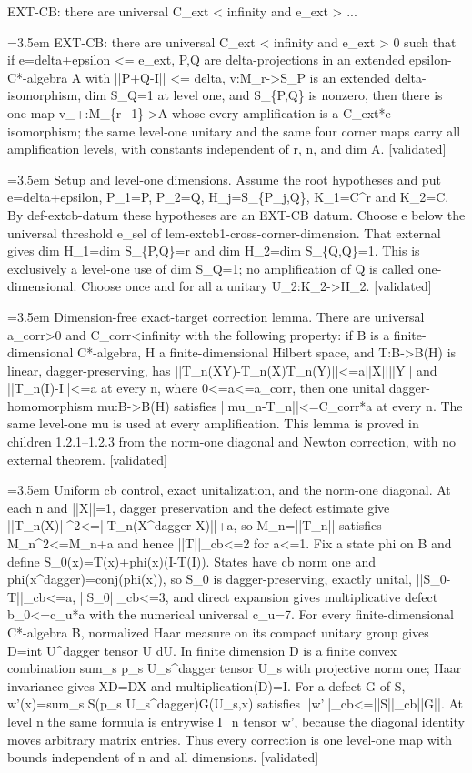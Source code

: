 \documentclass{article}
\newcommand{\step}[1]{\par\noindent\hangindent=3.5em\hangafter=1%
  \makebox[3.5em][l]{\textbf{#1.}}}
\newcommand{\steptag}[1]{\hfill{\small\textsf{[#1]}}}
\begin{document}
\begin{proofbox}{EXT-CB: there are universal C\_ext < infinity and e\_ext > ...}
\step{1} EXT-CB: there are universal C\_ext < infinity and e\_ext > 0 such that if e=delta+epsilon <= e\_ext, P,Q are delta-projections in an extended epsilon-C*-algebra A with ||P+Q-I|| <= delta, v:M\_r->S\_P is an extended delta-isomorphism, dim S\_Q=1 at level one, and S\_\{P,Q\} is nonzero, then there is one map v\_+:M\_\{r+1\}->A whose every amplification is a C\_ext*e-isomorphism; the same level-one unitary and the same four corner maps carry all amplification levels, with constants independent of r, n, and dim A. \steptag{validated} \\[6pt]
\step{1.1} Setup and level-one dimensions. Assume the root hypotheses and put e=delta+epsilon, P\_1=P, P\_2=Q, H\_j=S\_\{P\_j,Q\}, K\_1=C\textasciicircum{}r and K\_2=C. By def-extcb-datum these hypotheses are an EXT-CB datum. Choose e below the universal threshold e\_sel of lem-extcb1-cross-corner-dimension. That external gives dim H\_1=dim S\_\{P,Q\}=r and dim H\_2=dim S\_\{Q,Q\}=1. This is exclusively a level-one use of dim S\_Q=1; no amplification of Q is called one-dimensional. Choose once and for all a unitary U\_2:K\_2->H\_2. \steptag{validated} \\[4pt]
\step{1.2} Dimension-free exact-target correction lemma. There are universal a\_corr>0 and C\_corr<infinity with the following property: if B is a finite-dimensional C*-algebra, H a finite-dimensional Hilbert space, and T:B->B(H) is linear, dagger-preserving, has ||T\_n(XY)-T\_n(X)T\_n(Y)||<=a||X||||Y|| and ||T\_n(I)-I||<=a at every n, where 0<=a<=a\_corr, then one unital dagger-homomorphism mu:B->B(H) satisfies ||mu\_n-T\_n||<=C\_corr*a at every n. The same level-one mu is used at every amplification. This lemma is proved in children 1.2.1--1.2.3 from the norm-one diagonal and Newton correction, with no external theorem. \steptag{validated} \\[6pt]
\step{1.2.1} Uniform cb control, exact unitalization, and the norm-one diagonal. At each n and ||X||=1, dagger preservation and the defect estimate give ||T\_n(X)||\textasciicircum{}2<=||T\_n(X\textasciicircum{}dagger X)||+a, so M\_n=||T\_n|| satisfies M\_n\textasciicircum{}2<=M\_n+a and hence ||T||\_cb<=2 for a<=1. Fix a state phi on B and define S\_0(x)=T(x)+phi(x)(I-T(I)). States have cb norm one and phi(x\textasciicircum{}dagger)=conj(phi(x)), so S\_0 is dagger-preserving, exactly unital, ||S\_0-T||\_cb<=a, ||S\_0||\_cb<=3, and direct expansion gives multiplicative defect b\_0<=c\_u*a with the numerical universal c\_u=7. For every finite-dimensional C*-algebra B, normalized Haar measure on its compact unitary group gives D=int U\textasciicircum{}dagger tensor U dU. In finite dimension D is a finite convex combination sum\_s p\_s U\_s\textasciicircum{}dagger tensor U\_s with projective norm one; Haar invariance gives XD=DX and multiplication(D)=I. For a defect G of S, w'(x)=sum\_s S(p\_s U\_s\textasciicircum{}dagger)G(U\_s,x) satisfies ||w'||\_cb<=||S||\_cb||G||. At level n the same formula is entrywise I\_n tensor w', because the diagonal identity moves arbitrary matrix entries. Thus every correction is one level-one map with bounds independent of n and all dimensions. \steptag{validated} \\[4pt]

\end{proofbox}
\end{document}
